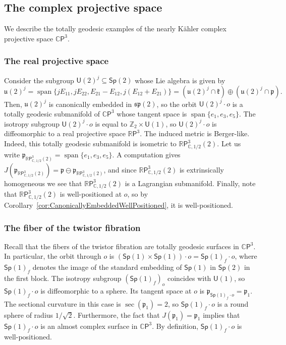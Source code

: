 \documentclass[11pt,a4paper,final]{amsart}
\newcommand{\s}{\mathsf}
\newcommand{\g}{\mathfrak}
\newcommand{\R}{\mathbb{R}}
\newcommand{\C}{\mathbb{C}}
\newcommand{\vecspan}{\operatorname{span}}
\newcommand{\spann}{\operatorname{span}}
\theoremstyle{definition}
\begin{document}
\subsection{The complex projective space}\label{subsec:excp3}
We describe the totally geodesic examples of the nearly Kähler complex projective space $\C\s{P}^3$.
\subsubsection{The real projective space \cite[Example~3.9]{Aslan}}
	
Consider the subgroup $\mathsf{U}(2)^{j}\subseteq \mathsf{Sp}(2)$ whose Lie algebra is given by
\begin{equation*}
	\g{u}(2)^{j}=\spann\bigl\{
		jE_{11},jE_{22},E_{21}-E_{12},j(E_{12}+E_{21})
	\bigr\}=(\g{u}(2)^{j}\cap\g{k})\oplus(\g{u}(2)^{j}\cap \g{p}).
\end{equation*}
Then, $\g{u}(2)^{j}$ is canonically embedded in $\g{sp}(2)$, so the orbit $\mathsf{U}(2)^{j}\cdot o$ is a totally geodesic submanifold of $\C\mathsf{P}^{3}$ whose tangent space is $\vecspan\{e_{1},e_{3},e_{5}\}$.
The isotropy subgroup $\mathsf{U}(2)^{j}\cdot o$ is equal to $\mathbb{Z}_{2}\times \mathsf{U}(1)$, so $\mathsf{U}(2)^{j}\cdot o$ is diffeomorphic to a real projective space $\R \mathsf{P}^{3}$.
The induced metric is Berger-like.
Indeed, this totally geodesic submanifold is isometric to $\R\s{P}^3_{\C,1/2}(2)$.
Let us write $\g{p}_{\R\mathsf{P}^{3}_{\C,1/2}(2)}=\vecspan\{e_1,e_3,e_5\}$.
A computation gives $J(\g{p}_{\R\mathsf{P}^{3}_{\C,1/2}(2)})=\g{p}\ominus \g{p}_{\R\mathsf{P}^{3}_{\C,1/2}(2)}$, and since $\R\mathsf{P}^{3}_{\C,1/2}(2)$ is extrinsically homogeneous we see that $\R\mathsf{P}^{3}_{\C,1/2}(2)$ is a Lagrangian submanifold.
Finally, note that $\R\s{P}^{3}_{\C,1/2}(2)$ is well-positioned at $o$, so by Corollary~\ref{cor:CanonicallyEmbeddedWellPositioned}, it is well-positioned.
	
\subsubsection{The fiber of the twistor fibration}
	
Recall that the fibers of the twistor fibration are totally geodesic surfaces in $\C\mathsf{P}^{3}$.
In particular, the orbit through $o$ is $\left(\mathsf{Sp}(1)\times\mathsf{Sp}(1)\right)\cdot o=\mathsf{Sp}(1)_{f}\cdot o$, where $\mathsf{Sp}(1)_{f}$ denotes the image of the standard embedding of $\s{Sp}(1)$ in $\s{Sp}(2)$ in the first block.
The isotropy subgroup $(\mathsf{Sp}(1)_{f})_{o}$ coincides with $\mathsf{U}(1)$, so $\mathsf{Sp}(1)_{f}\cdot o$ is diffeomorphic to a sphere.
Its tangent space at $o$ is $\g{p}_{\mathsf{Sp}(1)_{f}\cdot o}=\g{p}_{1}$.
The sectional curvature in this case is $\operatorname{sec}(\g{p}_{1})=2$, so $\mathsf{Sp}(1)_{f}\cdot o$ is a round sphere of radius $1/\sqrt{2}$.
Furthermore, the fact that $J(\g{p}_{1})=\g{p}_{1}$ implies that $\mathsf{Sp}(1)_{f}\cdot o$ is an almost complex surface in $\C\mathsf{P}^{3}$.
By definition, $\s{Sp}(1)_{f}\cdot o$ is well-positioned.
	
\end{document}
